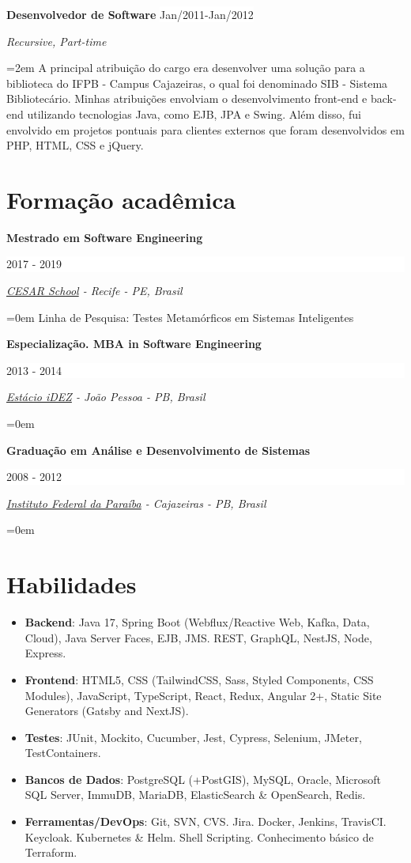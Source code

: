 \documentclass[a4paper,10pt]{article}
\newcommand{\NewPart}[1]{\section*{\large{\textbf{#1}}}}
\newcommand{\EducationEntry}[4]{
		\noindent \textbf{#1} \hfill 					%
		\colorbox{White}{%
			\parbox{6em}{%
			\hfill\color{Black}#2}} \par				%
		\noindent \textit{#3} \par						%
		\noindent \hangindent=0em\hangafter=0 \normalsize #4 	%
		\normalsize \par
		\vspace{0.5em}
	}
\newcommand{\WorkEntry}[4]{								%
		\noindent \textbf{#1} \hfill 					%
		\colorbox{White}{\color{Black}#2} \par			%
		\noindent \textit{#3} \par						%
		\noindent\hangindent=2em\hangafter=0 \normalsize #4 	%
		\normalsize \par
		\vspace{0.5em}
	}
\begin{document}
\WorkEntry{Desenvolvedor de Software}{Jan/2011-Jan/2012}{Recursive, Part-time}{A principal atribuição do cargo era desenvolver uma solução para a biblioteca do IFPB - Campus Cajazeiras, o qual foi denominado SIB - Sistema Bibliotecário. Minhas atribuições envolviam o desenvolvimento front-end e back-end utilizando tecnologias Java, como EJB, JPA e Swing. Além disso, fui envolvido em projetos pontuais para clientes externos que foram desenvolvidos em PHP, HTML, CSS e jQuery.}

\NewPart{Formação acadêmica}

\EducationEntry{Mestrado em Software Engineering}{2017 - 2019}{\href{https://cesar.school/}{CESAR School} - Recife - PE, Brasil}{Linha de Pesquisa: Testes Metamórficos em Sistemas Inteligentes}

\EducationEntry{Especialização. MBA in Software Engineering}{2013 - 2014}{\href{https://estacio.br/}{Estácio iDEZ} - João Pessoa - PB, Brasil}{}

\EducationEntry{Graduação em Análise e Desenvolvimento de Sistemas}{2008 - 2012}{\href{https://www.ifpb.edu.br/}{Instituto Federal da Paraíba} - Cajazeiras - PB, Brasil}{}



\NewPart{Habilidades}
\begin{multicols}{2}
\begin{itemize}
    \item \textbf{Backend}: Java 17, Spring Boot (Webflux/Reactive Web, Kafka, Data, Cloud), Java Server Faces, EJB, JMS. REST, GraphQL, NestJS, Node, Express.
    \item \textbf{Frontend}: HTML5, CSS (TailwindCSS, Sass, Styled Components, CSS Modules), JavaScript, TypeScript, React, Redux, Angular 2+, Static Site Generators (Gatsby and NextJS).
    \item \textbf{Testes}: JUnit, Mockito, Cucumber, Jest, Cypress, Selenium, JMeter, TestContainers.
    \item \textbf{Bancos de Dados}: PostgreSQL (+PostGIS), MySQL, Oracle, Microsoft SQL Server, ImmuDB, MariaDB, ElasticSearch \& OpenSearch, Redis.
    \item \textbf{Ferramentas/DevOps}: Git, SVN, CVS. Jira. Docker, Jenkins, TravisCI. Keycloak. Kubernetes \& Helm. Shell Scripting. Conhecimento básico de Terraform.
\end{itemize}
\end{multicols}
\end{document}
